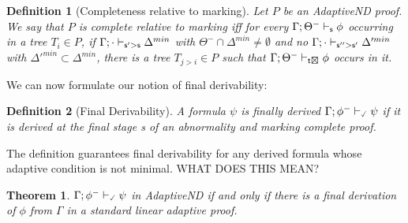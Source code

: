 \documentclass[]{article}
\newtheorem{definition}{Definition}
\newtheorem{theorem}{Theorem}
\newcommand{\TurnChecked}[2]
    { {#1}\vdash_{\textbf{\sf \checked}}  {#2}}
\begin{document}
\begin{definition}[Completeness relative to marking]
Let $P$ be an {\sf AdaptiveND} proof. We say that $P$ is complete relative to marking
iff for every $\Gamma; \Theta^{-}\vdash_{{\sf s}} \phi$ occurring in a tree $T_{i}\in P$, if $\Gamma; \cdot\vdash_{{\sf s'>s}} \Delta^{min}$ with $\Theta^{-}\cap \Delta^{min}\neq \emptyset$ and no $\Gamma; \cdot\vdash_{{\sf s''>s'}} \Delta'^{min}$ with $\Delta'^{min}\subset \Delta^{min}$, there is a tree $T_{j>i}\in P$ such that $\Gamma; \Theta^{-}\vdash_{{\sf t\XBox}} \phi$ occurs in it.

\end{definition}


We can now formulate our notion of final derivability:

\begin{definition}[Final Derivability]\label{def:finalder}
A formula $\psi$ is finally derived $\TurnChecked{\Gamma;\phi^{-}}{\psi}$ if it is derived at the final stage {\sf s} of an abnormality and marking complete proof.
\end{definition}
%
The definition guarantees final derivability for any derived formula {\color{red}whose adaptive condition is not minimal. WHAT DOES THIS MEAN?}



\begin{theorem}
$\TurnChecked{\Gamma;\phi^{-}}{\psi}$ in {\sf AdaptiveND} if and only if there is a final derivation of $\phi$ from $\Gamma$ in a standard linear adaptive proof.
\end{theorem}
\end{document}
